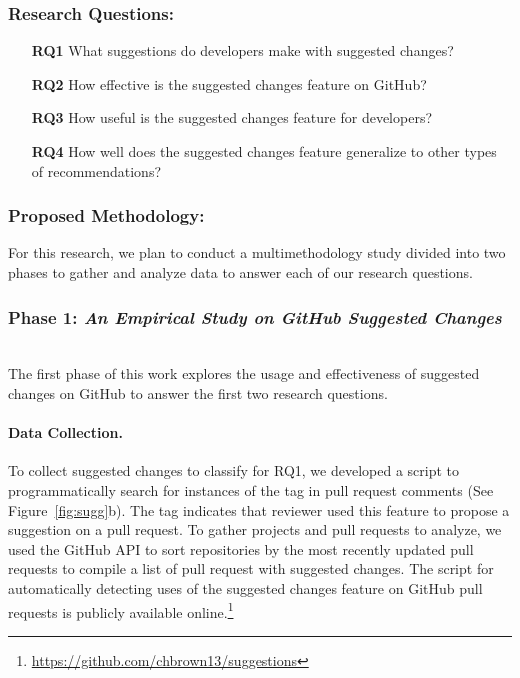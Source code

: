 \subsubsection{Research Questions:}

\begin{itemize}
    \item[\textbf{RQ1}] What suggestions do developers make with suggested changes?
    \item[\textbf{RQ2}] How effective is the suggested changes feature on GitHub?
    \item[\textbf{RQ3}] How useful is the suggested changes feature for developers?
    \item[\textbf{RQ4}] How well does the suggested changes feature generalize to other types of recommendations?
\end{itemize}

\subsubsection{Proposed Methodology:} For this research, we plan to conduct a multimethodology study divided into two phases to gather and analyze data to answer each of our research questions. \\

\subsubsection{Phase 1: \textit{An Empirical Study on GitHub Suggested Changes}} \hfill\\

The first phase of this work explores the usage and effectiveness of suggested changes on GitHub to answer the first two research questions.

\paragraph{Data Collection.}

To collect suggested changes to classify for RQ1, we developed a script to programmatically search for instances of the \sugg tag in pull request comments (See Figure~\ref{fig:sugg}b). The \sugg tag indicates that reviewer used this feature to propose a suggestion on a pull request. To gather projects and pull requests to analyze, we used the GitHub API to sort repositories by the most recently updated pull requests to compile a list of pull request with suggested changes. The script for automatically detecting uses of the suggested changes feature on GitHub pull requests is publicly available online.\footnote{\url{https://github.com/chbrown13/suggestions}}

